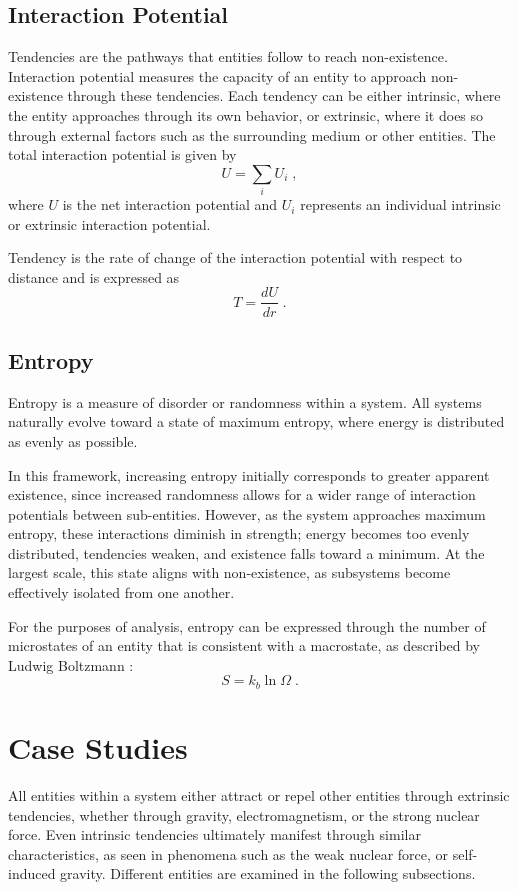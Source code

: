 \documentclass{article}
\begin{document}
\subsection{Interaction Potential}

Tendencies are the pathways that entities follow to reach non-existence. 
Interaction potential measures the capacity of an entity to approach non-existence through these tendencies. 
Each tendency can be either intrinsic, where the entity approaches through its own behavior, or extrinsic, where it does so through external factors such as the surrounding medium or other entities.
The total interaction potential is given by
\[
    U = \sum_i U_i\;,
\]
where $U$ is the net interaction potential and $U_i$ represents an individual intrinsic or extrinsic interaction potential. 

Tendency is the rate of change of the interaction potential with respect to distance and is expressed as
\[
    T = \frac{dU}{dr}\;.
\]


\subsection{Entropy}

Entropy is a measure of disorder or randomness within a system. 
All systems naturally evolve toward a state of maximum entropy, where energy is distributed as evenly as possible. 

In this framework, increasing entropy initially corresponds to greater apparent existence, since increased randomness allows for a wider range of interaction potentials between sub-entities. 
However, as the system approaches maximum entropy, these interactions diminish in strength; energy becomes too evenly distributed, tendencies weaken, and existence falls toward a minimum. 
At the largest scale, this state aligns with non-existence, as subsystems become effectively isolated from one another.

For the purposes of analysis, entropy can be expressed through the number of microstates of an entity that is consistent with a macrostate, as described by Ludwig Boltzmann \cite{BoltzmannTranslation2015}:
\[
    S = k_b \ln \Omega\;.
\]



\newpage
\section{Case Studies}

All entities within a system either attract or repel other entities through extrinsic tendencies, whether through gravity, electromagnetism, or the strong nuclear force. 
Even intrinsic tendencies ultimately manifest through similar characteristics, as seen in phenomena such as the weak nuclear force, or self-induced gravity. 
Different entities are examined in the following subsections.
\end{document}
